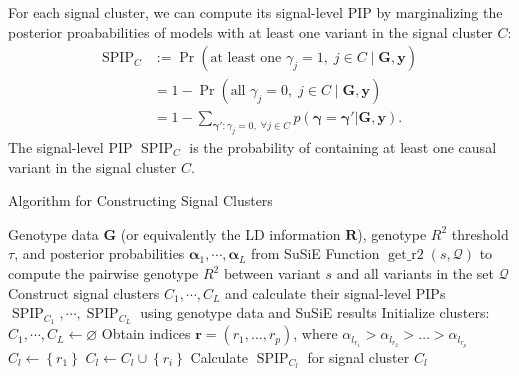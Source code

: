 \documentclass[pdflatex,sn-mathphys-num]{sn-jnl}%
\theoremstyle{thmstyleone}%
\theoremstyle{thmstyletwo}%
\theoremstyle{thmstylethree}%
\begin{document}
For each signal cluster, we can compute its signal-level PIP by marginalizing the posterior proababilities of models with at least one variant in the signal cluster $C$:
\begin{align}
    \operatorname{SPIP}_{C} &:= \operatorname{Pr}\left(\text{at least one }\gamma_j=1, \; j \in C \mid \mathbf{G},\mathbf{y}\right) \\
    &= 1 - \operatorname{Pr}\left(\text{all }\gamma_j=0,\; j \in C \mid \mathbf{G},\mathbf{y}\right) \\
    &= 1 - \sum_{\boldsymbol{\gamma}':\gamma_{j} = 0, \; \forall j \in C} p(\boldsymbol{\gamma}=\boldsymbol{\gamma}'|\mathbf{G},\mathbf{y}).
\end{align}
The signal-level PIP $\operatorname{SPIP}_{C}$ is the probability of containing at least one causal variant in the signal cluster $C$.
    
\begin{algorithm}
    \caption{Algorithm for Constructing Signal Clusters}\label{signal_clusters}
    \begin{algorithmic}[1]
    \Require Genotype data $\mathbf{G}$ (or equivalently the LD information $\mathbf{R}$), genotype $R^2$ threshold $\tau$, and posterior probabilities $\boldsymbol{\alpha}_1, \cdots, \boldsymbol{\alpha}_L$ from SuSiE
    \Require Function $\operatorname{get\_r2}\left(s,\mathcal{Q}\right)$ to compute the pairwise genotype $R^2$ between variant $s$ and all variants in the set $\mathcal{Q}$
    \Ensure Construct signal clusters $C_1, \cdots, C_L$ and calculate their signal-level PIPs $\operatorname{SPIP}_{C_1}, \cdots, \operatorname{SPIP}_{C_L}$ using genotype data and SuSiE results
    \State Initialize clusters: $C_1, \cdots, C_L \gets \varnothing$
        \State Obtain indices $\boldsymbol{r} = \left(r_1,\ldots,r_p\right)$, where $\alpha_{l_{r_1}} > \alpha_{l_{r_2}} > \ldots > \alpha_{l_{r_p}}$ 
        \State $C_l \gets \left\{r_1\right\}$ 
                \State $C_l \gets C_l \cup \left\{r_i\right\}$ 
            \EndIf
        \EndFor
        \State Calculate $\operatorname{SPIP}_{C_l}$ for signal cluster $C_l$ 
    \EndFor
    \end{algorithmic}
\end{algorithm}
\end{document}
